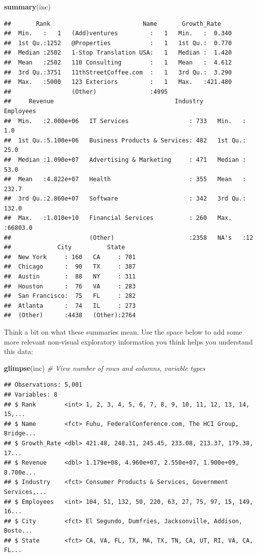 \documentclass[]{article}
\newenvironment{Shaded}{\begin{snugshade}}{\end{snugshade}}
\newcommand{\KeywordTok}[1]{\textcolor[rgb]{0.13,0.29,0.53}{\textbf{#1}}}
\newcommand{\CommentTok}[1]{\textcolor[rgb]{0.56,0.35,0.01}{\textit{#1}}}
\newcommand{\NormalTok}[1]{#1}
\begin{document}
\begin{Shaded}
\begin{Highlighting}[]
\KeywordTok{summary}\NormalTok{(inc)}
\end{Highlighting}
\end{Shaded}

\begin{verbatim}
##       Rank                          Name       Growth_Rate     
##  Min.   :   1   (Add)ventures         :   1   Min.   :  0.340  
##  1st Qu.:1252   @Properties           :   1   1st Qu.:  0.770  
##  Median :2502   1-Stop Translation USA:   1   Median :  1.420  
##  Mean   :2502   110 Consulting        :   1   Mean   :  4.612  
##  3rd Qu.:3751   11thStreetCoffee.com  :   1   3rd Qu.:  3.290  
##  Max.   :5000   123 Exteriors         :   1   Max.   :421.480  
##                 (Other)               :4995                    
##     Revenue                                  Industry      Employees      
##  Min.   :2.000e+06   IT Services                 : 733   Min.   :    1.0  
##  1st Qu.:5.100e+06   Business Products & Services: 482   1st Qu.:   25.0  
##  Median :1.090e+07   Advertising & Marketing     : 471   Median :   53.0  
##  Mean   :4.822e+07   Health                      : 355   Mean   :  232.7  
##  3rd Qu.:2.860e+07   Software                    : 342   3rd Qu.:  132.0  
##  Max.   :1.010e+10   Financial Services          : 260   Max.   :66803.0  
##                      (Other)                     :2358   NA's   :12       
##             City          State     
##  New York     : 160   CA     : 701  
##  Chicago      :  90   TX     : 387  
##  Austin       :  88   NY     : 311  
##  Houston      :  76   VA     : 283  
##  San Francisco:  75   FL     : 282  
##  Atlanta      :  74   IL     : 273  
##  (Other)      :4438   (Other):2764
\end{verbatim}

Think a bit on what these summaries mean. Use the space below to add
some more relevant non-visual exploratory information you think helps
you understand this data:

\begin{Shaded}
\begin{Highlighting}[]
\KeywordTok{glimpse}\NormalTok{(inc) }\CommentTok{# View number of rows and columns, variable types}
\end{Highlighting}
\end{Shaded}

\begin{verbatim}
## Observations: 5,001
## Variables: 8
## $ Rank        <int> 1, 2, 3, 4, 5, 6, 7, 8, 9, 10, 11, 12, 13, 14, 15,...
## $ Name        <fct> Fuhu, FederalConference.com, The HCI Group, Bridge...
## $ Growth_Rate <dbl> 421.48, 248.31, 245.45, 233.08, 213.37, 179.38, 17...
## $ Revenue     <dbl> 1.179e+08, 4.960e+07, 2.550e+07, 1.900e+09, 8.700e...
## $ Industry    <fct> Consumer Products & Services, Government Services,...
## $ Employees   <int> 104, 51, 132, 50, 220, 63, 27, 75, 97, 15, 149, 16...
## $ City        <fct> El Segundo, Dumfries, Jacksonville, Addison, Bosto...
## $ State       <fct> CA, VA, FL, TX, MA, TX, TN, CA, UT, RI, VA, CA, FL...
\end{verbatim}
\end{document}
